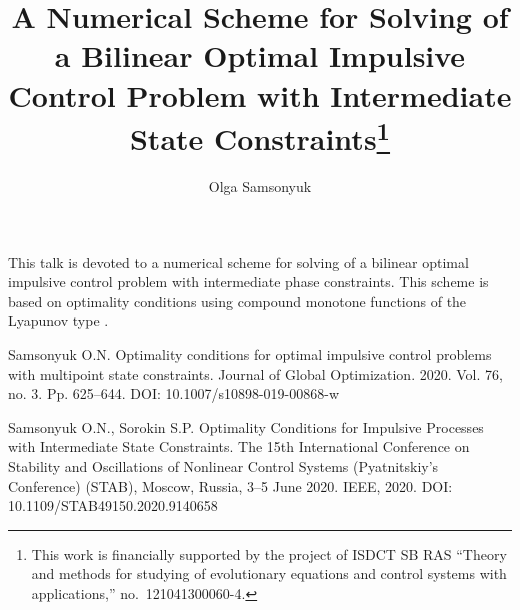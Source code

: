 \documentclass[12pt]{llncs}
\begin{document}
%
\fi

\title{A Numerical Scheme for Solving of a Bilinear Optimal Impulsive Control Problem with Intermediate State Constraints\thanks{This work is financially supported by the project of ISDCT SB RAS ``Theory and methods for studying  of evolutionary equations and control systems with applications,'' no.~121041300060-4.}}
\author{Olga Samsonyuk}

\maketitle

\begin{abstract}

\end{abstract}


This talk is devoted to a numerical scheme for solving of a bilinear  optimal impulsive control problem with intermediate phase constraints. This scheme is based on optimality conditions using compound monotone functions of the Lyapunov type \cite{samnla1,samnla2}.


\begin{thebibliography}{5}
 Samsonyuk O.N. Optimality conditions for optimal impulsive control
problems with multipoint state constraints. Journal of Global Optimization. 2020. Vol.
76, no. 3. Pp. 625--644. DOI: 10.1007/s10898-019-00868-w 

 Samsonyuk O.N., Sorokin S.P. Optimality Conditions for Impulsive
Processes with Intermediate State Constraints.  The 15th International Conference on
Stability and Oscillations of Nonlinear Control Systems (Pyatnitskiy's Conference)
(STAB), Moscow, Russia, 3--5  June 2020.  IEEE, 2020.  DOI: 
10.1109/STAB49150.2020.9140658
\end{thebibliography}

\end{document}
